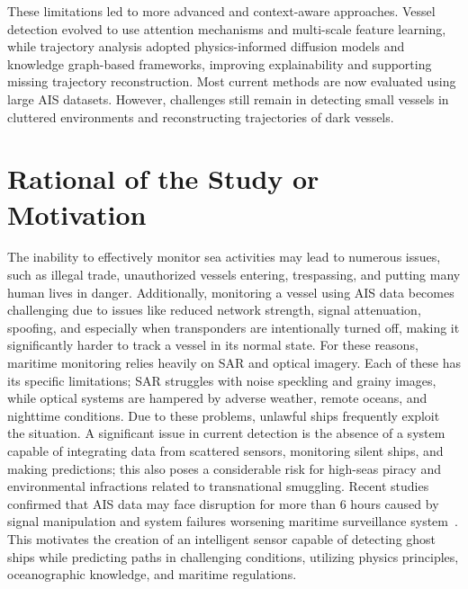 These limitations led to more advanced and context-aware approaches. Vessel detection evolved to use attention mechanisms and multi-scale feature learning, while trajectory analysis adopted physics-informed diffusion models and knowledge graph-based frameworks, improving explainability and supporting missing trajectory reconstruction. Most current methods are now evaluated using large AIS datasets. However, challenges still remain in detecting small vessels in cluttered environments and reconstructing trajectories of dark vessels. \\



\section{Rational of the Study or Motivation}
The inability to effectively monitor sea activities may lead to numerous issues, such as illegal trade, unauthorized vessels entering, trespassing, and putting many human lives in danger. Additionally, monitoring a vessel using AIS data becomes challenging due to issues like reduced network strength, signal attenuation, spoofing, and especially when transponders are intentionally turned off, making it significantly harder to track a vessel in its normal state. For these reasons, maritime monitoring relies heavily on SAR and optical imagery. Each of these has its specific limitations; SAR struggles with noise speckling and grainy images, while optical systems are hampered by adverse weather, remote oceans, and nighttime conditions. Due to these problems, unlawful ships frequently exploit the situation. A significant issue in current detection is the absence of a system capable of integrating data from scattered sensors, monitoring silent ships, and making predictions; this also poses a considerable risk for high-seas piracy and environmental infractions related to transnational smuggling. Recent studies confirmed that AIS data may face disruption  for more than 6 hours caused by signal manipulation and system failures worsening maritime surveillance system~\cite{10.1145/3637528.3672086}. This motivates the creation of an intelligent sensor capable of detecting ghost ships while predicting paths in challenging conditions, utilizing physics principles, oceanographic knowledge, and maritime regulations.\\


